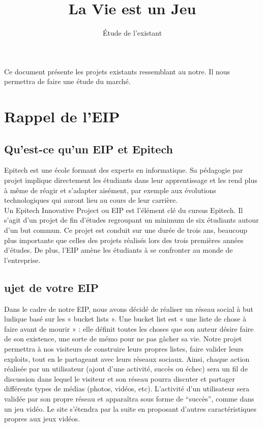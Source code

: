 \documentclass{life-fr}
\begin{document}
\title{La Vie est un Jeu}
\subtitle{Étude de l'existant}

\summary
{
  Ce document présente les projets existants ressemblant au notre. Il nous permettra de faire une étude du marché.
}

\maketitle

\tableofcontents

\chapter{Rappel de l’EIP}
\section{Qu’est-ce qu’un EIP et Epitech}
Epitech est une école formant des experts en informatique. Sa pédagogie par projet implique directement les étudiants dans leur apprentissage et les rend plus à même de réagir et s'adapter aisément, par exemple aux évolutions technologiques qui auront lieu au cours de leur carrière.\\

Un Epitech Innovative Project ou EIP est l'élément clé du cursus Epitech. Il s'agit d'un projet de fin d'études regroupant un minimum de six étudiants autour d'un but commun. Ce projet est conduit sur une durée de trois ans, beaucoup plus importante que celles des projets réalisés lors des trois premières années d'études. De plus, l’EIP amène les étudiants à se confronter au monde de l’entreprise.

\section{ujet de votre EIP}
Dans le cadre de notre EIP, nous avons décidé de réaliser un réseau social à but ludique basé sur les « bucket lists ». Une bucket list est « une liste de chose à faire avant de mourir » : elle définit toutes les choses que son auteur désire faire de son existence, une sorte de mémo pour ne pas gâcher sa vie. Notre projet permettra à nos visiteurs de construire leurs propres listes, faire valider leurs exploits, tout en le partageant avec leurs réseaux sociaux. Ainsi, chaque action réalisée par un utilisateur (ajout d’une activité, succès ou échec) sera un fil de discussion dans lequel le visiteur et son réseau pourra discuter et partager différents types de médias (photos, vidéos, etc). L’activité d’un utilisateur sera validée par son propre réseau et apparaîtra sous forme de “succès”, comme dans un jeu vidéo. Le site s’étendra par la suite en proposant d’autres caractéristiques propres aux jeux vidéos.
\end{document}
